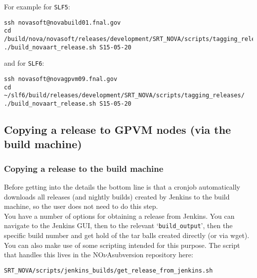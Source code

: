 \documentclass[letterpaper,10pt]{article}
\newcommand{\nova}{NO$\nu$A}
\newcommand{\novas}{\nova \space}
\begin{document}
\noindent
For example for \verb|SLF5|:

\begin{verbatim}
ssh novasoft@novabuild01.fnal.gov
cd /build/nova/novasoft/releases/development/SRT_NOVA/scripts/tagging_releases/
./build_novaart_release.sh S15-05-20
\end{verbatim}

\noindent
and for \verb|SLF6|:
\begin{verbatim}
ssh novasoft@novagpvm09.fnal.gov
cd ~/slf6/build/releases/development/SRT_NOVA/scripts/tagging_releases/
./build_novaart_release.sh S15-05-20
\end{verbatim} 



\subsection{Copying a release to GPVM nodes (via the build machine)}

\subsubsection{Copying a release to the build machine}

Before getting into the details the bottom line is that a cronjob automatically downloads all releases (and nightly builds) created by Jenkins to the build machine, so the user does not need to do this step.\\

You have a number of options for obtaining a release from Jenkins. You can navigate to the Jenkins GUI, then to the relevant `\verb|build_output|', then the specific build number and get hold of the tar balls created directly (or via wget). You can also make use of some scripting intended for this purpose. The script that handles this lives in the \novas subversion repository here:

\begin{verbatim}
SRT_NOVA/scripts/jenkins_builds/get_release_from_jenkins.sh
\end{verbatim}
\end{document}
